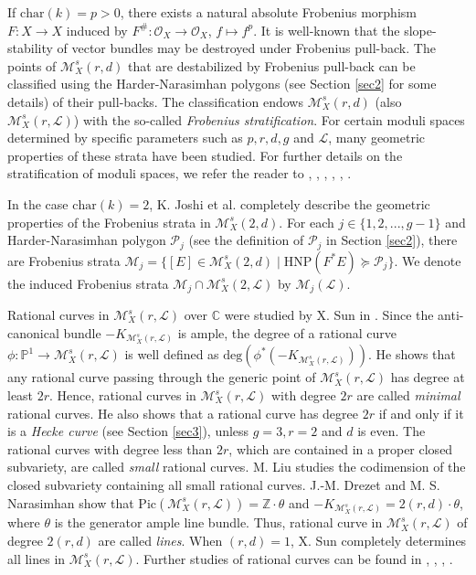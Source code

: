 \documentclass{kms-b}
\numberwithin{equation}{section}
\theoremstyle{plain}
\theoremstyle{definition}
\theoremstyle{remark}
\begin{document}
If $\mathrm{char}(k)=p>0$, there exists a natural absolute Frobenius morphism $F:X \to X$ induced by $F^{\#}:\mathcal{O}_X \to \mathcal{O}_X$, $f \mapsto f^p$. It is well-known that the slope-stability of vector bundles may be destroyed under Frobenius pull-back. The points of $\mathcal{M}^s_X(r,d)$ that are destabilized by Frobenius pull-back can be classified using the  Harder-Narasimhan polygons (see Section \ref{sec2} for some details) of their pull-backs. The classification endows   $\mathcal{M}^s_X(r,d)$ (also $\mathcal{M}^s_X(r,\mathcal{L})$) with the so-called \emph{Frobenius stratification}. For certain moduli spaces determined by specific parameters such as $p,r,d,g$ and $\mathcal{L}$, many geometric properties of these strata have been studied. For further details on the  stratification of moduli spaces, we refer the reader to \cite{PazLange},  \cite{RussoBigas}, \cite{JRXY06}, \cite{Li19I}, \cite{Li20II}, \cite{LiZhang24}. 

In the case $\mathrm{char}(k)=2$, K. Joshi et al. \cite{JRXY06} completely describe the geometric properties of the Frobenius strata in $\mathcal{M}^{s}_X(2,d)$. For each $j\in \{1,2,...,g-1\}$ and Harder-Narasimhan polygon $\mathscr{P}_j$ (see the definition of $\mathscr{P}_j$ in Section \ref{sec2}), there are Frobenius strata $\mathcal{M}_j=  \big\{ [E]\in \mathcal{M}_X^s(2,d) \mid \mathrm{HNP}(F^*E) \succcurlyeq \mathscr{P}_j \big\}$. We denote the induced Frobenius strata 
$\mathcal{M}_j \cap \mathcal{M}^s_X(2,\mathcal{L})$ by $\mathcal{M}_j(\mathcal{L})$.


Rational curves in $\mathcal{M}_X^s(r,\mathcal{L})$  over $\mathbb{C}$ were studied by X. Sun in \cite{Sun05}.  Since the anti-canonical bundle $-K_{\mathcal{M}_X^s(r,\mathcal{L})}$ is ample, the degree of a rational curve $\phi: \mathbb{P}^1 \to \mathcal{M}_X^s(r,\mathcal{L})$ is well defined as $\mathrm{deg} (\phi^*(-K_{\mathcal{M}_X^s(r,\mathcal{L})}))$. He shows that any rational curve passing through the generic point of $\mathcal{M}_X^s(r,\mathcal{L})$ has degree at least $2r$. Hence, rational curves in $\mathcal{M}^s_X(r,\mathcal{L})$ with degree $2r$ are called \emph{minimal} rational curves. He also shows that a rational curve has degree $2r$ if and only if it is a \emph{Hecke curve} (see Section \ref{sec3}), unless $g = 3, r = 2$ and $d$ is even. The rational curves with degree less than $2r$, which are contained in a proper closed subvariety, are called \emph{small} rational curves. M. Liu \cite{Liu12} studies the codimension of the closed subvariety containing all small rational curves. J.-M. Drezet and M. S. Narasimhan \cite{DreNar89} show that $\mathrm{Pic}(\mathcal{M}^s_X(r,\mathcal{L})) = \mathbb{Z}\cdot \theta $ and $-K_{\mathcal{M}^s_X(r,\mathcal{L})}=2(r,d) \cdot \theta$, where $\theta$ is the generator ample line bundle. Thus, rational curve in $\mathcal{M}_X^s(r,\mathcal{L})$ of degree $2(r,d)$ are called \emph{lines}.  When $(r,d)=1$, X. Sun \cite{Sun05} completely determines all lines in $\mathcal{M}_X^s(r,\mathcal{L})$. Further studies of rational curves can be found in \cite{ChoeChungLee}, \cite{Hwang04}, \cite{Kollar13}, \cite{MokSun09}.
\end{document}
